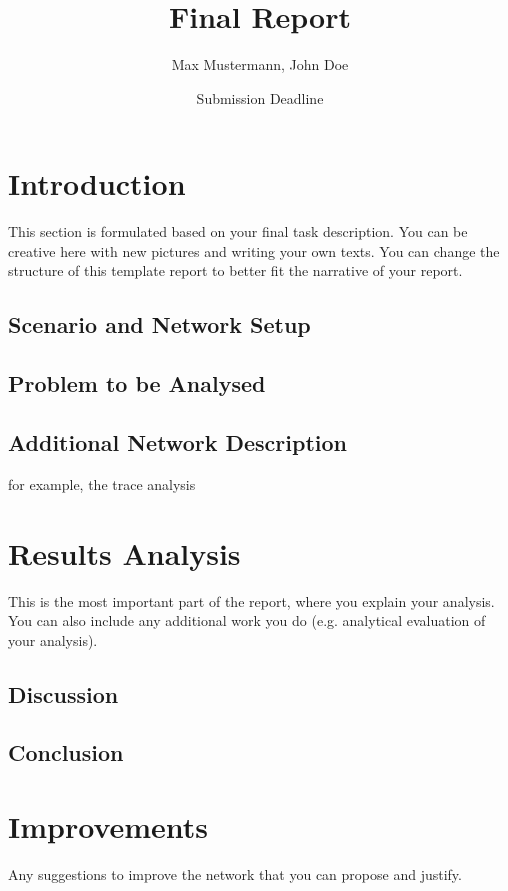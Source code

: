 \documentclass{comnets-thesis}
\title{Final Report}
\author{Max Mustermann, John Doe}
\date{Submission Deadline}
\begin{document}
\maketitlepage

\chapter{Introduction}
This section is formulated based on your final task description. You can be creative here with new pictures and writing your own texts. 
You can change the structure of this template report to better fit the narrative of your report.

\section{Scenario and Network Setup}

\section{Problem to be Analysed}

\section{Additional Network Description}
for example, the trace analysis

\chapter{Results Analysis}
This is the most important part of the report, where you explain your analysis.
You can also include any additional work you do (e.g. analytical evaluation of your analysis).
\section{Discussion}

\section{Conclusion}

\chapter{Improvements}
Any suggestions to improve the network that you can propose and justify. 

\listoffigures
\listoftables
\printbibliography[heading=bibintoc]
\end{document}
